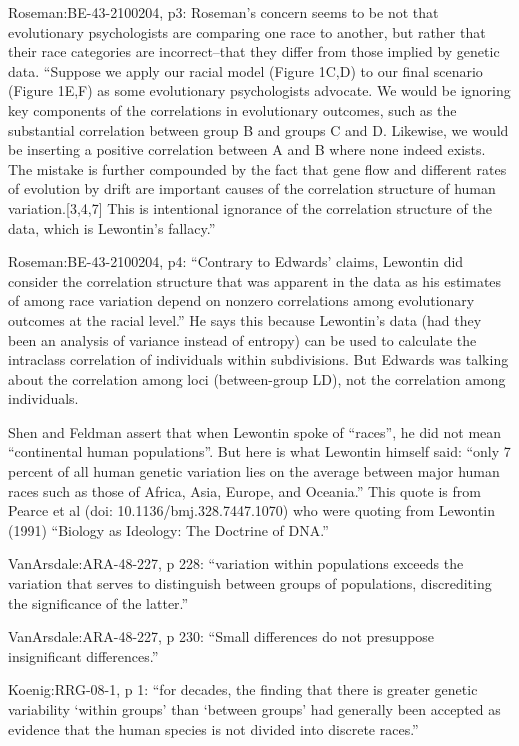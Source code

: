 \documentclass[11pt]{article}
\begin{document}
Roseman:BE-43-2100204, p3: Roseman's concern seems to be not that
evolutionary psychologists are comparing one race to another, but
rather that their race categories are incorrect--that they differ
from those implied by genetic data. ``Suppose we apply our racial
model (Figure 1C,D) to our final scenario (Figure 1E,F) as some
evolutionary psychologists advocate. We would be ignoring key
components of the correlations in evolutionary outcomes, such as the
substantial correlation between group B and groups C and
D. Likewise, we would be inserting a positive correlation between A
and B where none indeed exists. The mistake is further compounded by
the fact that gene flow and different rates of evolution by drift
are important causes of the correlation structure of human
variation.[3,4,7] This is intentional ignorance of the correlation
structure of the data, which is Lewontin’s fallacy.''

Roseman:BE-43-2100204, p4: ``Contrary to Edwards’ claims, Lewontin
did consider the correlation structure that was apparent in the data
as his estimates of among race variation depend on nonzero
correlations among evolutionary outcomes at the racial level.'' He
says this because Lewontin's data (had they been an analysis of
variance instead of entropy) can be used to calculate the intraclass
correlation of individuals within subdivisions. But Edwards was
talking about the correlation among loci (between-group LD), not the
correlation among individuals.

Shen and Feldman assert that when Lewontin spoke of ``races'', he did
not mean ``continental human populations''. But here is what Lewontin
himself said: ``only 7 percent of all human genetic variation lies on
the average between major human races such as those of Africa, Asia,
Europe, and Oceania.'' This quote is from Pearce et al (doi:
10.1136/bmj.328.7447.1070) who were quoting from Lewontin (1991)
``Biology as Ideology: The Doctrine of DNA.''

VanArsdale:ARA-48-227, p 228: ``variation within populations exceeds
the variation that serves to distinguish between groups of
populations, discrediting the significance of the latter.''

VanArsdale:ARA-48-227, p 230: ``Small differences do not presuppose
insignificant differences.''

Koenig:RRG-08-1, p 1: ``for decades, the finding that there is
greater genetic variability `within groups' than `between groups'
had generally been accepted as evidence that the human species is
not divided into discrete races.''
\end{document}
